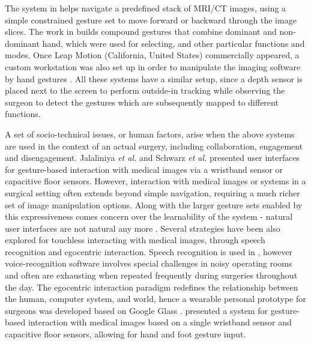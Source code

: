The system in \cite{Strickland2013} helps navigate a predefined stack of MRI/CT images, using a simple constrained gesture set to move forward or backward through the image slices. 
The work in \cite{Tan2013} builds compound gestures that combine dominant and non-dominant hand, which were used for selecting, and other particular functions and modes. 
Once Leap Motion {(California, United States)} commercially appeared, a custom workstation was also set up in order to manipulate the imaging software by hand gestures \cite{Rosa2014}. 
All these systems have a similar setup, since a depth sensor is placed next to the screen to perform outside-in tracking while observing the surgeon to detect the gestures which are subsequently mapped to different functions. 

A set of socio-technical issues, or human factors, arise when the above systems are used in the context of an actual surgery, including collaboration, engagement and disengagement. 
Jalaliniya \textit{et al.} \cite{Jalaliniya2013} and Schwarz \textit{et al.} \cite{Schwarz2011a} presented user interfaces for gesture-based interaction with medical images via a wristband sensor or capacitive floor sensors. However, interaction with medical images or systems in a surgical setting often extends beyond simple navigation, requiring a much richer set of image manipulation options. 
Along with the larger gesture sets enabled by this expressiveness comes concern over the learnability of the system - natural user interfaces are not natural any more \cite{Norman2010a}. 
Several strategies have been also explored for touchless interacting with medical images, through speech recognition and egocentric interaction. 
Speech recognition is used in \cite{Ebert2012}, however voice-recognition software involves special challenges in noisy operating rooms and often are exhausting when repeated frequently during surgeries throughout the day. The egocentric interaction paradigm \cite{Pederson2010} redefines the relationship between the human, computer system, and world, hence a wearable personal prototype for surgeons was developed based on Google Glass \cite{Jalaliniya2015}.
\citet{Factors2015} presented a system for gesture-based interaction with medical images based on a single wristband sensor and capacitive floor sensors, allowing for hand and foot gesture input.
